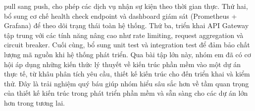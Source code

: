 pull sang push, cho phép các dịch vụ nhận sự kiện theo thời gian thực. Thứ hai, bổ sung cơ chế health check endpoint và dashboard giám sát (Prometheus + Grafana) để theo dõi trạng thái toàn hệ thống. Thứ ba, triển khai API Gateway tập trung với các tính năng nâng cao như rate limiting, request aggregation và circuit breaker. Cuối cùng, bổ sung unit test và integration test để đảm bảo chất lượng mã nguồn khi hệ thống phát triển. Qua bài tập lớn này, nhóm em đã có cơ hội áp dụng những kiến thức lý thuyết về kiến trúc phần mềm vào một dự án thực tế, từ khâu phân tích yêu cầu, thiết kế kiến trúc cho đến triển khai và kiểm thử. Đây là trải nghiệm quý báu giúp nhóm hiểu sâu sắc hơn về tầm quan trọng của thiết kế kiến trúc trong phát triển phần mềm và sẵn sàng cho các dự án lớn hơn trong tương lai.
